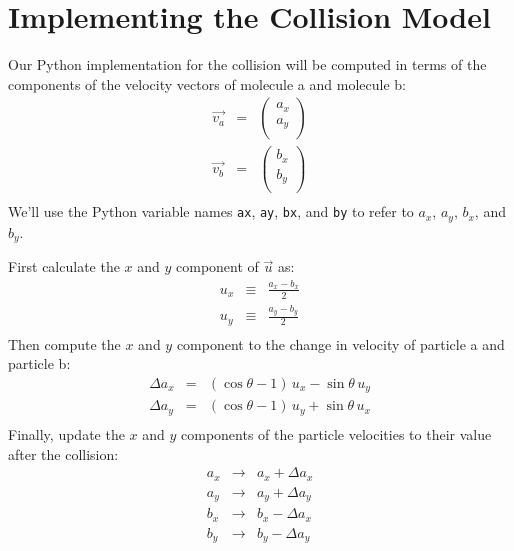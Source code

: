 {\section{Implementing the Collision Model}

Our Python implementation for the collision will be computed in terms
of the components of the velocity vectors of molecule a and molecule
b:
\begin{eqnarray*}
\vec{v_a} &=& 
\begin{pmatrix}
a_x \\
a_y \\
\end{pmatrix} \\
\vec{v_b} &=& 
\begin{pmatrix}
b_x \\
b_y \\
\end{pmatrix} \\
\end{eqnarray*}
We'll use the Python variable names {\tt ax}, {\tt ay}, {\tt bx}, and {\tt by} to refer to $a_x$,  $a_y$,  $b_x$, and $b_y$.  

First calculate the $x$ and $y$ component of $\vec{u}$ as:
\begin{eqnarray*}
u_x &\equiv& \frac{a_x - b_x}{2} \\
u_y &\equiv& \frac{a_y - b_y}{2} \\
\end{eqnarray*}
Then compute the $x$ and $y$ component to the change in velocity of particle a and particle b:
\begin{eqnarray*}
  \Delta a_x &=& (\cos\theta - 1) \, u_x - \sin\theta \, u_y \\
  \Delta a_y &=& (\cos\theta - 1) \, u_y + \sin\theta \,  u_x \\
\end{eqnarray*}
Finally, update the $x$ and $y$ components of the particle velocities to their value after the collision:
\begin{eqnarray*}
  a_x &\to& a_x + \Delta a_x \\
  a_y &\to& a_y + \Delta a_y \\
  b_x &\to& b_x - \Delta a_x \\
  b_y &\to& b_y - \Delta a_y \\
\end{eqnarray*}

\newpage

}
